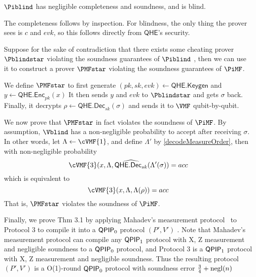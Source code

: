 \begin{thm}
	$\Piblind$ has negligible completeness and soundness, and is blind.
\end{thm}
\begin{prf}
	The completeness follows by inspection.
	For blindness, the only thing the prover sees is $c$ and $evk$, so this follows directly from $\mathsf{QHE}$'s security.
	
	Suppose for the sake of contradiction that there exists some cheating prover $\Pblindstar$ violating the soundness guarantees of $\Piblind$ 
	,
	then we can use it to construct a prover $\PMFstar$ violating the soundness guarantees of $\PiMF$.

	

	We define $\PMFstar$ to first generate
	$(pk, sk, evk)\leftarrow\mathsf{QHE.Keygen}$
	and
	$y\leftarrow\mathsf{QHE.Enc}_{pk}(x)$
	It then sends $y$ and $evk$ to $\Pblindstar$ and gets $\sigma$ back.
	Finally, it decrypts
	$\rho\leftarrow\mathsf{QHE.Dec}_{sk}(\sigma)$
	and sends it to $\VMF$ qubit-by-qubit.

    
	We now prove that $\PMFstar$ in fact violates the soundness of $\PiMF$.
    By assumption, $\Vblind$ has a non-negligible probability to accept after receiving $\sigma$.
	In other words, let $\Lambda\leftarrow\cVMF{1}$, and define $\Lambda'$ by \cref{decodeMeasureOrder},
	then with non-negligible probability
	$$\cVMF{3}(x, \Lambda, \widehat{\mathsf{QHE.Dec}_{sk}}(\Lambda'(\sigma))=acc$$
	which is equivalent to
	$$\cVMF{3}(x, \Lambda, \Lambda(\rho))=acc$$
	That is, $\PMFstar$ violates the soundness of $\PiMF$.
\end{prf}


Finally, we prove Thm 3.1 by applying Mahadev's measurement protocol~\cite{mahadev_delegation} to Protocol 3 to compile it into a $\operatorname{\mathsf{QPIP}}_0$ protocol $(P', V')$ .
Note that Mahadev's measurement protocol can compile any $\operatorname{\mathsf{QPIP}}_1$ protocol with X, Z measurement and negligible soundness to a $\operatorname{\mathsf{QPIP}}_0$ protocol, and Protocol 3 is a $\operatorname{\mathsf{QPIP}}_1$ protocol with X, Z measurement and negligible soundness.
Thus the resulting protocol $(P', V')$ is a O(1)-round $\operatorname{\mathsf{QPIP}}_0$ protocol with soundness error $\frac{3}{4} + \operatorname{negl}(n)$

